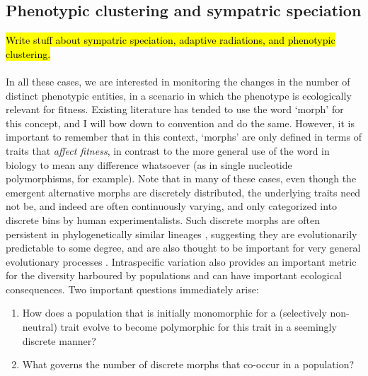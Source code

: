 \subsection{Phenotypic clustering and sympatric speciation}
\hl{Write stuff about sympatric speciation, adaptive radiations, and phenotypic clustering.}
\\
\\
In all these cases, we are interested in monitoring the changes in the number of distinct phenotypic entities, in a scenario in which the phenotype is ecologically relevant for fitness. Existing literature has tended to use the word `morph' for this concept, and I will bow down to convention and do the same. However, it is important to remember that in this context, `morphs' are only defined in terms of traits that \textit{affect fitness}, in contrast to the more general use of the word in biology to mean any difference whatsoever (as in single nucleotide polymorphisms, for example). Note that in many of these cases, even though the emergent alternative morphs are discretely distributed, the underlying traits need not be, and indeed are often continuously varying, and only categorized into discrete bins by human experimentalists. Such discrete morphs are often persistent in phylogenetically similar lineages \citep{jamie_persistence_2020}, suggesting they are evolutionarily predictable to some degree, and are also thought to be important for very general evolutionary processes \citep{west-eberhard_alternative_1986}. Intraspecific variation also provides an important metric for the diversity harboured by populations and can have important ecological consequences. Two important questions immediately arise:

\begin{enumerate}
    \item How does a population that is initially monomorphic for a (selectively non-neutral) trait evolve to become polymorphic for this trait in a seemingly discrete manner?
    \item What governs the number of discrete morphs that co-occur in a population?
\end{enumerate}

